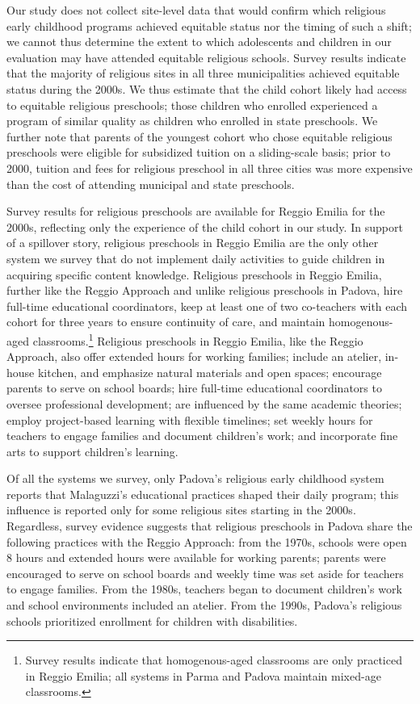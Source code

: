 Our study does not collect site-level data that would confirm which religious early childhood programs achieved equitable status nor the timing of such a shift; we cannot thus determine the extent to which adolescents and children in our evaluation may have attended equitable religious schools. Survey results indicate that the majority of religious sites in all three municipalities achieved equitable status during the 2000s. We thus estimate that the child cohort likely had access to equitable religious preschools; those children who enrolled experienced a program of similar quality as children who enrolled in state preschools. We further note that parents of the youngest cohort who chose equitable religious preschools were eligible for subsidized tuition on a sliding-scale basis; prior to 2000, tuition and fees for religious preschool in all three cities was more expensive than the cost of attending municipal and state preschools.

Survey results for religious preschools are available for Reggio Emilia for the 2000s, reflecting only the experience of the child cohort in our study. In support of a spillover story, religious preschools in Reggio Emilia are the only other system we survey that do not implement daily activities to guide children in acquiring specific content knowledge. Religious preschools in Reggio Emilia, further like the Reggio Approach and unlike religious preschools in Padova, hire full-time educational coordinators, keep at least one of two co-teachers with each cohort for three years to ensure continuity of care, and maintain homogenous-aged classrooms.\footnote{Survey results indicate that homogenous-aged classrooms are only practiced in Reggio Emilia; all systems in Parma and Padova maintain mixed-age classrooms.} Religious preschools in Reggio Emilia, like the Reggio Approach, also offer extended hours for working families; include an atelier, in-house kitchen, and emphasize natural materials and open spaces; encourage parents to serve on school boards; hire full-time educational coordinators to oversee professional development; are influenced by the same academic theories; employ project-based learning with flexible timelines; set weekly hours for teachers to engage families and document children's work; and incorporate fine arts to support children's learning. 

Of all the systems we survey, only Padova's religious early childhood system reports that Malaguzzi's educational practices shaped their daily program; this influence is reported only for some religious sites starting in the 2000s. Regardless, survey evidence suggests that religious preschools in Padova share the following practices with the Reggio Approach: from the 1970s, schools were open 8 hours and extended hours were available for working parents; parents were encouraged to serve on school boards and weekly time was set aside for teachers to engage families. From the 1980s, teachers began to document children's work and school environments included an atelier. From the 1990s, Padova's religious schools prioritized enrollment for children with disabilities. 

